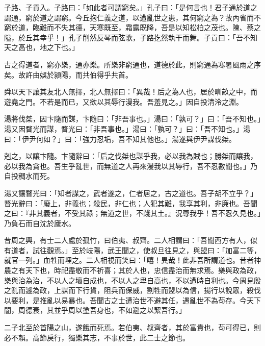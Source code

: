 \begin{pinyinscope}
子路、子貢入。子路曰：「如此者可謂窮矣。」孔子曰：「是何言也！君子通於道之謂通，窮於道之謂窮。今丘抱仁義之道，以遭亂世之患，其何窮之為？故內省而不窮於道，臨難而不失其德，天寒既至，霜露既降，吾是以知松柏之茂也。陳、蔡之隘，於丘其幸乎！」孔子削然反琴而弦歌，子路扢然執干而舞。子貢曰：「吾不知天之高也，地之下也。」

古之得道者，窮亦樂，通亦樂。所樂非窮通也，道德於此，則窮通為寒暑風雨之序矣。故許由娛於潁陽，而共伯得乎共首。

舜以天下讓其友北人無擇，北人無擇曰：「異哉！后之為人也，居於甽畝之中，而遊堯之門。不若是而已，又欲以其辱行漫我。吾羞見之。」因自投清泠之淵。

湯將伐桀，因卞隨而謀，卞隨曰：「非吾事也。」湯曰：「孰可？」曰：「吾不知也。」湯又因瞀光而謀，瞀光曰：「非吾事也。」湯曰：「孰可？」曰：「吾不知也。」湯曰：「伊尹何如？」曰：「強力忍垢，吾不知其他也。」湯遂與伊尹謀伐桀。

剋之，以讓卞隨。卞隨辭曰：「后之伐桀也謀乎我，必以我為賊也；勝桀而讓我，必以我為貪也。吾生乎亂世，而無道之人再來漫我以其辱行，吾不忍數聞也。」乃自投稠水而死。

湯又讓瞀光曰：「知者謀之，武者遂之，仁者居之，古之道也。吾子胡不立乎？」瞀光辭曰：「廢上，非義也；殺民，非仁也；人犯其難，我享其利，非廉也。吾聞之曰：『非其義者，不受其祿；無道之世，不踐其土。』況尊我乎！吾不忍久見也。」乃負石而自沈於廬水。

昔周之興，有士二人處於孤竹，曰伯夷、叔齊。二人相謂曰：「吾聞西方有人，似有道者，試往觀焉。」至於岐陽，武王聞之，使叔旦往見之，與盟曰：「加富二等，就官一列。」血牲而埋之。二人相視而笑曰：「嘻！異哉！此非吾所謂道也。昔者神農之有天下也，時祀盡敬而不祈喜；其於人也，忠信盡治而無求焉。樂與政為政，樂與治為治，不以人之壞自成也，不以人之卑自高也，不以遭時自利也。今周見殷之亂而遽為政，上謀而下行貨，阻兵而保威，割牲而盟以為信，揚行以說眾，殺伐以要利，是推亂以易暴也。吾聞古之士遭治世不避其任，遇亂世不為苟存。今天下闇，周德衰，其並乎周以塗吾身也，不如避之以絜吾行。」

二子北至於首陽之山，遂餓而死焉。若伯夷、叔齊者，其於富貴也，苟可得已，則必不賴。高節戾行，獨樂其志，不事於世，此二士之節也。


\end{pinyinscope}